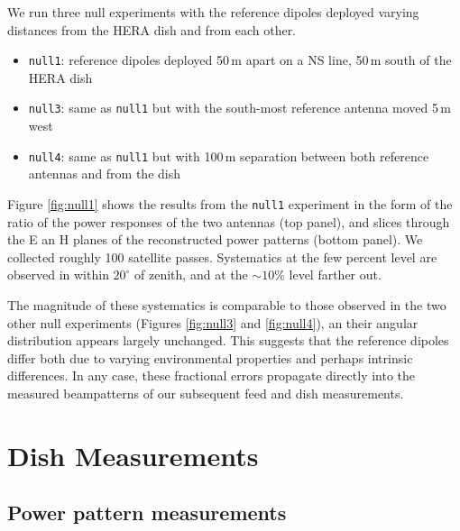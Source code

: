 \documentclass[preprint]{aastex}
\begin{document}
We run three null experiments with the reference dipoles deployed varying distances from the HERA dish and from each other.

\begin{itemize}
\item \texttt{null1}: reference dipoles deployed 50\,m apart on a NS line, 50\,m south of the HERA dish
\item \texttt{null3}: same as \texttt{null1} but with the south-most reference antenna moved 5\,m west
\item \texttt{null4}: same as \texttt{null1} but with 100\,m separation between both reference antennas and from the dish
\end{itemize}

Figure \ref{fig:null1} shows the  results from the \texttt{null1} experiment in the form of the ratio of the power responses of the two antennas (top panel), and slices through the E an H planes of the reconstructed power patterns (bottom panel). We collected roughly 100 satellite passes. Systematics at the few percent level are observed in  within $20^\circ$ of zenith, and at the $\sim10\%$ level farther out.

The magnitude of these systematics is comparable to those observed in the two other null experiments (Figures \ref{fig:null3} and \ref{fig:null4}), an their angular distribution appears largely unchanged. This suggests that the reference dipoles differ both due to varying environmental properties and perhaps intrinsic differences. In any case, these fractional errors propagate directly into the measured beampatterns of our subsequent feed and dish measurements.  


\section{Dish Measurements}

\subsection{Power pattern measurements}
\end{document}

